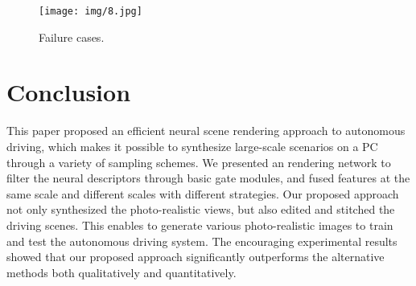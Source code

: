 \documentclass[sigconf]{acmart}
\begin{document}
\begin{figure}[h]
  \centering
  \texttt{[image: img/8.jpg]}
  \caption{Failure cases.}
\label{fig:label8}
\end{figure}
 
\section{Conclusion}
This paper proposed an efficient neural scene rendering approach to autonomous driving, which makes it possible to synthesize large-scale scenarios on a PC through a variety of sampling schemes. We presented an  rendering network to filter the neural descriptors through basic gate modules, and fused features at the same scale and different scales with different strategies. Our proposed approach not only synthesized the photo-realistic views, but also edited and stitched the driving scenes. This enables to generate various photo-realistic images to train and test the autonomous driving system. The encouraging experimental results showed that our proposed approach significantly outperforms the alternative methods both qualitatively and quantitatively.





\newpage




\appendix
\end{document}
